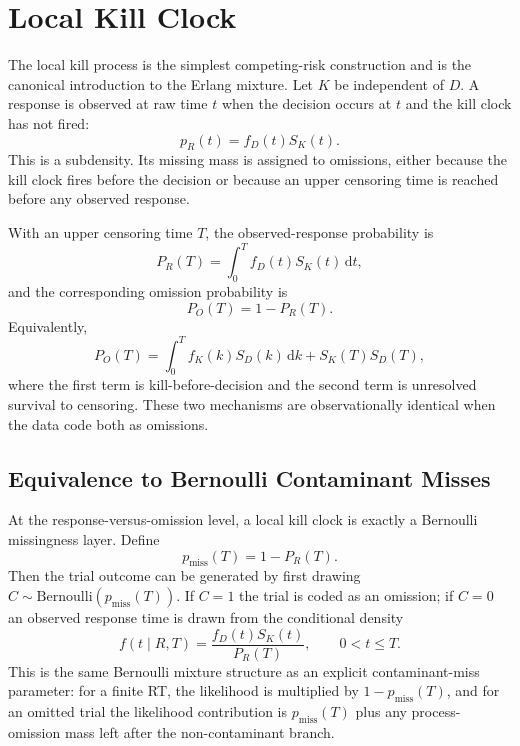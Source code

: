 \documentclass[12pt]{article}
\newcommand{\dd}{\,\mathrm{d}}
\begin{document}
\section{Local Kill Clock}
\label{sec:kill}
The local kill process is the simplest competing-risk construction and is the canonical introduction to the Erlang mixture. Let $K$ be independent of $D$. A response is observed at raw time $t$ when the decision occurs at $t$ and the kill clock has not fired:
\begin{equation}
  p_R(t)=f_D(t)S_K(t).
  \label{eq:local-kill-density}
\end{equation}
This is a subdensity. Its missing mass is assigned to omissions, either because the kill clock fires before the decision or because an upper censoring time is reached before any observed response.

With an upper censoring time $T$, the observed-response probability is
\begin{equation}
  P_R(T)=\int_0^T f_D(t)S_K(t)\dd t,
  \label{eq:kill-window-response}
\end{equation}
and the corresponding omission probability is
\begin{equation}
  P_O(T)=1-P_R(T).
  \label{eq:kill-window-omission}
\end{equation}
Equivalently,
\begin{equation}
  P_O(T)=\int_0^T f_K(k)S_D(k)\dd k+S_K(T)S_D(T),
\end{equation}
where the first term is kill-before-decision and the second term is unresolved survival to censoring. These two mechanisms are observationally identical when the data code both as omissions.

\subsection{Equivalence to Bernoulli Contaminant Misses}
At the response-versus-omission level, a local kill clock is exactly a Bernoulli missingness layer. Define
\begin{equation}
  p_{\mathrm{miss}}(T)=1-P_R(T).
\end{equation}
Then the trial outcome can be generated by first drawing $C\sim\mathrm{Bernoulli}(p_{\mathrm{miss}}(T))$. If $C=1$ the trial is coded as an omission; if $C=0$ an observed response time is drawn from the conditional density
\begin{equation}
  f(t\mid R,T)=\frac{f_D(t)S_K(t)}{P_R(T)}, \qquad 0<t\le T.
\end{equation}
This is the same Bernoulli mixture structure as an explicit contaminant-miss parameter: for a finite RT, the likelihood is multiplied by $1-p_{\mathrm{miss}}(T)$, and for an omitted trial the likelihood contribution is $p_{\mathrm{miss}}(T)$ plus any process-omission mass left after the non-contaminant branch.
\end{document}

